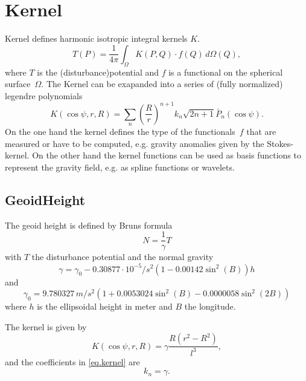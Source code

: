 \clearpage

\section{Kernel}\label{kernelType}
Kernel defines harmonic isotropic integral kernels $K$.
\begin{equation}
T(P) = \frac{1}{4\pi}\int_\Omega K(P,Q)\cdot f(Q)\,d\Omega(Q),
\end{equation}
where $T$ is the (disturbance)potential and $f$ is a functional on the spherical surface~$\Omega$.
The Kernel can be exapanded into a series of (fully normalized) legendre polynomials
\begin{equation}\label{eq.kernel}
K(\cos\psi,r,R) = \sum_n \left(\frac{R}{r}\right)^{n+1}
k_n\sqrt{2n+1}\bar{P}_n(\cos\psi).
\end{equation}
On the one hand the kernel defines the type of the functionals~$f$ that are measured
or have to be computed, e.g. gravity anomalies given by the Stokes-kernel.
On the other hand the kernel functions can be used as basis functions to represent
the gravity field, e.g. as spline functions or wavelets.


\subsection{GeoidHeight}\label{kernelType:geoidHeight}
The geoid height is defined by Bruns formula
\begin{equation}
N = \frac{1}{\gamma}T
\end{equation}
with $T$ the disturbance potential and the normal gravity
\begin{equation}\label{normalgravity}
\gamma  = \gamma_0 - 0.30877\cdot 10^{-5}/s^2(1-0.00142\sin^2(B))h
\end{equation}
and
\begin{equation}
\gamma_0 = 9.780327\,m/s^2(1+0.0053024\sin^2(B)-0.0000058\sin^2(2B))
\end{equation}
where $h$ is the ellipsoidal height in meter and $B$ the longitude.

The kernel is given by
\begin{equation}
K(\cos\psi,r,R) = \gamma\frac{R(r^2-R^2)}{l^3},
\end{equation}
and the coefficients in \eqref{eq.kernel} are
\begin{equation}
k_n = \gamma.
\end{equation}


